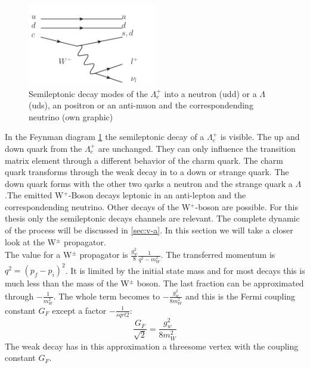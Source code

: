 \begin{figure}[h]
  \centering
  \includegraphics[page=1, width=0.5\textwidth]{semileptonic_lambdac+}
  \caption{Semileptonic decay modes of the \(\Lambda_c^+\) into a neutron (udd)
    or a \(\Lambda\) (uds), an positron or an anti-muon and the correspondending 
  neutrino (own graphic)}\label{fey:lambda}
\end{figure}

In the Feynman diagram {\ref{fey:lambda}} the semileptonic decay of a \(\Lambda_c^+\) 
is visible. The up and down quark from the \(\Lambda_c^+\) are unchanged. 
They can only influence the transition matrix element through a different 
behavior of the charm quark. The charm quark transforms through the weak 
decay in to a down or strange quark. The down quark forms with the other two 
qarks a neutron and the strange quark a \(\Lambda\).The emitted W\(^+\)-Boson 
decays leptonic in an anti-lepton and the correspondending neutrino.
Other decays of the W\(^+\)-boson are possible. For this thesis only the 
semileptonic decays channels are relevant. The complete dynamic of the process 
will be discussed in {\ref{sec:v-a}}. In this section we will take a closer 
look at the W\(^\pm\) propagator.\\
The value for a W\(^\pm\) propagator is \(\frac{g_w^2}{8}\frac{1}{q^2 - m_W^2}\).
The transferred momentum is \(q^2 = \left(p_f - p_i\right)^2\). It is limited 
by the initial state mass and for most decays this is much less than the mass 
of the W\(^\pm\) boson. The last fraction can be approximated through 
\(-\frac{1}{m_W^2}\). The whole term becomes to \(-\frac{g_w^2}{8 m_W^2}\) 
and this is the Fermi coupling constant \(G_F\) except a factor \(-\frac{1}{sqrt{2}}\):
\begin{equation}
  \frac{G_F}{\sqrt{2}} = \frac{g_w^2}{8 m_W^2} \nonumber
\end{equation}
The weak decay has in this approximation a threesome vertex with the coupling 
constant \(G_F\).

